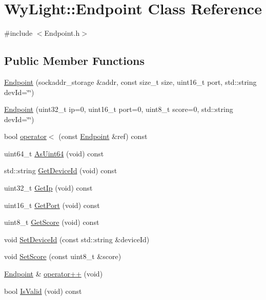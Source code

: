 \hypertarget{class_wy_light_1_1_endpoint}{\section{Wy\-Light\-:\-:Endpoint Class Reference}
\label{class_wy_light_1_1_endpoint}
}


{\ttfamily \#include $<$Endpoint.\-h$>$}

\subsection*{Public Member Functions}
\begin{DoxyCompactItemize}
\item 
\hyperlink{class_wy_light_1_1_endpoint_ab63ad1030b33a946e6874e9a95242652}{Endpoint} (sockaddr\-\_\-storage \&addr, const size\-\_\-t size, uint16\-\_\-t port, std\-::string dev\-Id=\char`\"{}\char`\"{})
\item 
\hyperlink{class_wy_light_1_1_endpoint_ad6953673c9ac61ebbedb32fac5b580ed}{Endpoint} (uint32\-\_\-t ip=0, uint16\-\_\-t port=0, uint8\-\_\-t score=0, std\-::string dev\-Id=\char`\"{}\char`\"{})
\item 
bool \hyperlink{class_wy_light_1_1_endpoint_a23413704ae873962f584e8e4bcb3a3b5}{operator$<$} (const \hyperlink{class_wy_light_1_1_endpoint}{Endpoint} \&ref) const 
\item 
uint64\-\_\-t \hyperlink{class_wy_light_1_1_endpoint_ae0269aa4b78b40366140a4fe98140e67}{As\-Uint64} (void) const 
\item 
std\-::string \hyperlink{class_wy_light_1_1_endpoint_a45f7f0b61014a9732a7c31dec22cfeaf}{Get\-Device\-Id} (void) const 
\item 
uint32\-\_\-t \hyperlink{class_wy_light_1_1_endpoint_a65cca33e7eef5794500621333d2246ed}{Get\-Ip} (void) const 
\item 
uint16\-\_\-t \hyperlink{class_wy_light_1_1_endpoint_ac59441c4d0b60d941150401c118ac63f}{Get\-Port} (void) const 
\item 
uint8\-\_\-t \hyperlink{class_wy_light_1_1_endpoint_a8e19107acfb14d455dde2206b971cc2d}{Get\-Score} (void) const 
\item 
void \hyperlink{class_wy_light_1_1_endpoint_aae5d14042f101187ab51b56dcf217318}{Set\-Device\-Id} (const std\-::string \&device\-Id)
\item 
void \hyperlink{class_wy_light_1_1_endpoint_acab91ff69fc991948b87121e5667b121}{Set\-Score} (const uint8\-\_\-t \&score)
\item 
\hyperlink{class_wy_light_1_1_endpoint}{Endpoint} \& \hyperlink{class_wy_light_1_1_endpoint_a6db37d31aac048566b112e1c25bea7fd}{operator++} (void)
\item 
bool \hyperlink{class_wy_light_1_1_endpoint_a4b0ccfbc29c760fb0c34e9365a3f587d}{Is\-Valid} (void) const 
\end{DoxyCompactItemize}
